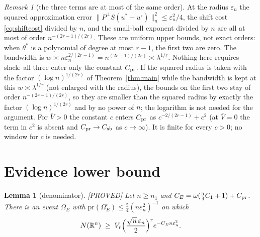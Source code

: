 \documentclass[11pt]{article}
\newtheorem{lemma}{Lemma}
\theoremstyle{definition}
\theoremstyle{remark}
\newtheorem{remark}{Remark}
\newcommand{\R}{\mathbb{R}}
\newcommand{\pr}{\mathrm{pr}}
\newcommand{\thetas}{\theta^{*}}
\newcommand{\om}{\omega}
\newcommand{\en}{\varepsilon_n}
\newcommand{\Pp}{P^{\perp}}
\newcommand{\Vb}{\bar V}
\newcommand{\nn}[1]{\|#1\|_n}
\newcommand{\proved}{\textup{[PROVED]}}
\begin{document}
\begin{remark}[the three terms are at most of the same order]\label{rem:balance}
At the radius $\en$ the squared approximation error $\nn{\Pp S(u^{*}-u^\circ)}^2\le\en^2/4$, the shift cost \eqref{eq:shiftcost} divided by $n$, and the small-ball exponent divided by $n$ are all at most of order $n^{-(2r-1)/(2r)}$. These are uniform upper bounds, not exact orders: when $\thetas$ is a polynomial of degree at most $r-1$, the first two are zero. The bandwidth is $w\asymp n\en^{2/(2r-1)}=n^{(2r-1)/(2r)}\asymp\lambda^{1/r}$. Nothing here requires slack: all three enter only the constant $C_{\rm pr}$. If the squared radius is taken with the factor $(\log n)^{1/(2r)}$ of Theorem~\ref{thm:main} while the bandwidth is kept at this $w\asymp\lambda^{1/r}$ (not enlarged with the radius), the bounds on the first two stay of order $n^{-(2r-1)/(2r)}$, so they are smaller than the squared radius by exactly the factor $(\log n)^{1/(2r)}$ and by no power of $n$; the logarithm is not needed for the argument. For $\Vb>0$ the constant $c$ enters $C_{\rm pr}$ as $c^{-2/(2r-1)}+c^{2}$ (at $\Vb=0$ the term in $c^2$ is absent and $C_{\rm pr}\to C_{\rm sb}$ as $c\to\infty$). It is finite for every $c>0$; no window for $c$ is needed.
\end{remark}

\section{Evidence lower bound}\label{sec:evidence}

\begin{lemma}[denominator]\label{lem:evid}\proved{}
Let $n\ge n_1$ and $C_E=\om(\tfrac54C_1+1)+C_{\rm pr}$. There is an event $\Omega_E$ with $\pr(\Omega_E^c)\le\tfrac54(n\en^2)^{-1}$ on which
\[
N(\R^n)\;\ge\;V_r\Bigl(\frac{\sqrt n\,\en}2\Bigr)^re^{-C_En\en^2}.
\]
\end{lemma}
\end{document}
